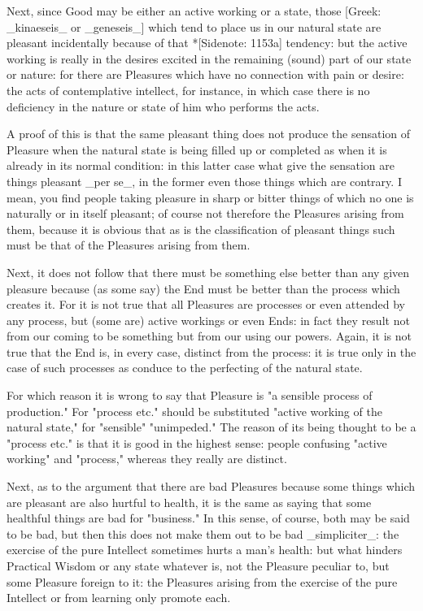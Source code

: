 Next, since Good may be either an active working or a state, those
[Greek: _kinaeseis_ or _geneseis_] which tend to place us in our natural
state are pleasant incidentally because of that *[Sidenote: 1153a]
tendency: but the active working is really in the desires excited in the
remaining (sound) part of our state or nature: for there are Pleasures
which have no connection with pain or desire: the acts of contemplative
intellect, for instance, in which case there is no deficiency in the
nature or state of him who performs the acts.

A proof of this is that the same pleasant thing does not produce the
sensation of Pleasure when the natural state is being filled up or
completed as when it is already in its normal condition: in this latter
case what give the sensation are things pleasant _per se_, in the former
even those things which are contrary. I mean, you find people taking
pleasure in sharp or bitter things of which no one is naturally or in
itself pleasant; of course not therefore the Pleasures arising from
them, because it is obvious that as is the classification of pleasant
things such must be that of the Pleasures arising from them.

Next, it does not follow that there must be something else better than
any given pleasure because (as some say) the End must be better than
the process which creates it. For it is not true that all Pleasures
are processes or even attended by any process, but (some are) active
workings or even Ends: in fact they result not from our coming to be
something but from our using our powers. Again, it is not true that the
End is, in every case, distinct from the process: it is true only in
the case of such processes as conduce to the perfecting of the natural
state.

For which reason it is wrong to say that Pleasure is "a sensible process
of production." For "process etc." should be substituted "active working
of the natural state," for "sensible" "unimpeded." The reason of its
being thought to be a "process etc." is that it is good in the highest
sense: people confusing "active working" and "process," whereas they
really are distinct.

Next, as to the argument that there are bad Pleasures because some
things which are pleasant are also hurtful to health, it is the same as
saying that some healthful things are bad for "business." In this sense,
of course, both may be said to be bad, but then this does not make
them out to be bad _simpliciter_: the exercise of the pure Intellect
sometimes hurts a man's health: but what hinders Practical Wisdom or
any state whatever is, not the Pleasure peculiar to, but some Pleasure
foreign to it: the Pleasures arising from the exercise of the pure
Intellect or from learning only promote each.

